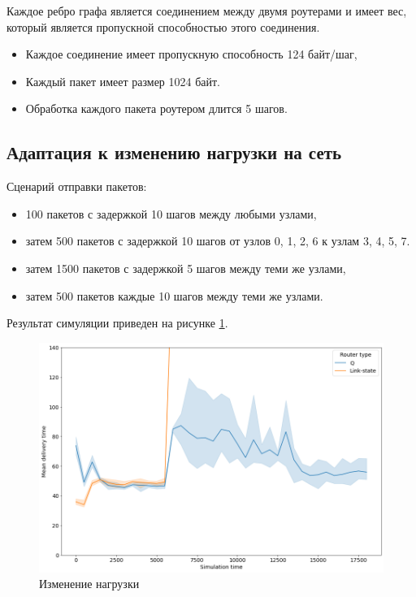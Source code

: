 \documentclass[a4paper]{article}
\begin{document}
Каждое ребро графа является соединением между двумя роутерами и имеет вес,
который является пропускной способностью этого соединения.

\begin{itemize}
    \item Каждое соединение имеет пропускную способность 124 байт/шаг,

    \item Каждый пакет имеет размер 1024 байт.

    \item Обработка каждого пакета роутером длится 5 шагов.
\end{itemize}

\subsection{Адаптация к изменению нагрузки на сеть}

Сценарий отправки пакетов:

\begin{itemize}
    \item 100 пакетов с задержкой 10 шагов между любыми узлами,

    \item затем 500 пакетов с задержкой 10 шагов от узлов 0, 1, 2, 6 к узлам 3,
        4, 5, 7.

    \item  затем 1500 пакетов с задержкой 5 шагов между теми же узлами,

    \item затем 500 пакетов каждые 10 шагов между теми же узлами.
\end{itemize}

Результат симуляции приведен на рисунке \ref{fig:load}.

\begin{figure}[H]
    \centering
    \includegraphics[width=\textwidth]{figs/load-increase}
    \caption{Изменение нагрузки}\label{fig:load}
\end{figure}
\end{document}
